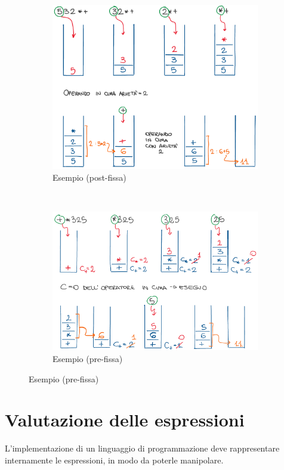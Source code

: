 \documentclass[a4paper,oneside,titlepage]{book}
\newcommand{\rulesep}{\unskip\ \vrule\ }
\begin{document}
\begin{figure}[htp]
\begin{subfigure}{0.49\textwidth}
		\includegraphics[width=\textwidth, height=\textheight, keepaspectratio]{post2.png}
		\caption{Esempio (post-fissa)}
	\end{subfigure}
	\rulesep
	\begin{subfigure}{0.49\textwidth}
		\includegraphics[width=\textwidth, height=\textheight, keepaspectratio]{pre2.png}
		\caption{Esempio (pre-fissa)}
	\end{subfigure}
\end{figure}

\section{Valutazione delle espressioni}
L'implementazione di un linguaggio di programmazione deve rappresentare internamente le espressioni, in modo da poterle manipolare.
\end{document}
